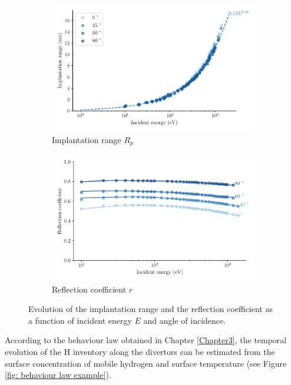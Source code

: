 \begin{figure}[h]
    \centering
    \begin{subfigure}{0.5\linewidth}
        \includegraphics[width=\linewidth]{Figures/divertor/implantation_range.pdf}
        \caption{Implantation range $R_p$}
        \label{fig: implantation range vs energy}
    \end{subfigure}%
    \begin{subfigure}{0.5\linewidth}                          
        \includegraphics[width=\linewidth]{Figures/divertor/reflection_coeff.pdf}
        \caption{Reflection coefficient $r$}
        \label{fig: reflection coeff vs energy}
    \end{subfigure}
    \caption{Evolution of the implantation range and the reflection coefficient as a function of incident energy $E$ and angle of incidence.}
\end{figure}

According to the behaviour law obtained in Chapter \ref{Chapter3}, the temporal evolution of the H inventory along the divertors can be estimated from the surface concentration of mobile hydrogen and surface temperature (see Figure \ref{fig: behaviour law example}).

